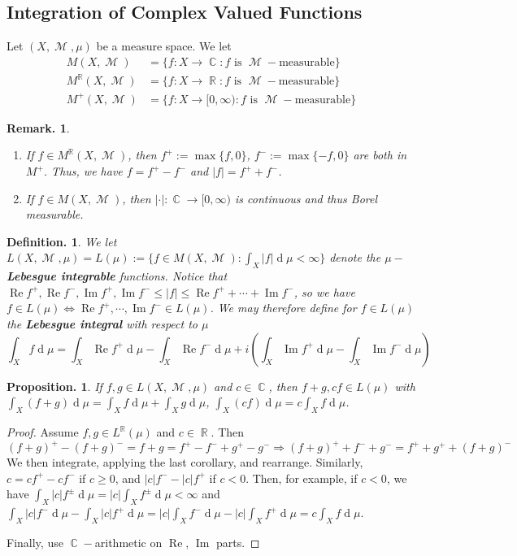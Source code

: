 \documentclass[11pt, a4paper]{memoir}
\DeclareMathOperator{\R}{{\mathbb{R}}}
\DeclareMathOperator{\C}{{\mathbb{C}}}
\theoremstyle{change}
\newtheorem{proposition}[theorem]{Proposition.}
\theoremstyle{plain}
\theoremstyle{nonumberplain}
\newtheorem{definition}{Definition.}
\newtheorem{remark}{Remark.}
\newtheorem{proof}{Proof}
\DeclareMathOperator{\M}{{\mathcal{M}}}
\renewcommand{\Re}{\ensuremath{\operatorname{Re}}}
\renewcommand{\Im}{\ensuremath{\operatorname{Im}}}
\renewcommand{\d}[1]{\ensuremath{\operatorname{d}\!{#1}}}
\numberwithin{equation}{section}
\begin{document}
\subsection{Integration of Complex Valued Functions}
Let $(X,\M,\mu)$ be a measure space.
We let
\begin{align*}
    M(X,\M)&=\{f:X\to\C:f\text{ is $\M-$measurable}\}\\
    M^{\R}(X,\M)&=\{f:X\to\R:f\text{ is $\M-$measurable}\}\\
    M^+(X,\M)&=\{f:X\to[0,\infty):f\text{ is $\M-$measurable}\}
\end{align*}
\begin{remark}
    \begin{enumerate}
        \item If $f\in M^{\R}(X,\M)$, then $f^+:=\max\{f,0\}$, $f^-:=\max\{-f,0\}$ are both in $M^+$.
            Thus, we have $f=f^+-f^-$ and $|f|=f^++f^-$.
        \item If $f\in M(X,\M)$, then $|\cdot|:\C\to[0,\infty)$ is continuous and thus Borel measurable. %
    \end{enumerate}
\end{remark}
\begin{definition}
    We let $L(X,\M,\mu)=L(\mu):=\{f\in M(X,\M):\int_X|f|\d{\mu}<\infty\}$ denote the \textbf{$\mu-$Lebesgue integrable} functions.
    Notice that $\Re f^+,\Re f^-,\Im f^+,\Im f^-\leq |f|\leq\Re f^++\cdots+\Im f^-$, so we have $f\in L(\mu)\Leftrightarrow \Re f^+,\cdots,\Im f^-\in L(\mu)$.
    We may therefore define for $f\in L(\mu)$ the \textbf{Lebesgue integral} with respect to $\mu$
    \begin{equation*}
        \int_X f\d{\mu}=\int_X\Re f^+\d{\mu}-\int_X\Re f^-\d{\mu}+i\left(\int_X\Im f^+\d{\mu}-\int_X\Im f^-\d{\mu}\right)
    \end{equation*}
\end{definition}
\begin{proposition}
    If $f,g\in L(X,\M,\mu)$ and $c\in\C$, then $f+g,cf\in L(\mu)$ with $\int_X(f+g)\d{\mu}=\int_X f\d{\mu}+\int_X g\d{\mu}$, $\int_X(cf)\d{\mu}=c\int_X f\d{\mu}$.
\end{proposition}
\begin{proof}
    Assume $f,g\in L^{\R}(\mu)$ and $c\in\R$.
    Then
    \begin{equation*}
        (f+g)^+-(f+g)^-=f+g=f^+-f^-+g^+-g^-\Rightarrow(f+g)^++f^-+g^-=f^++g^++(f+g)^-
    \end{equation*}
    We then integrate, applying the last corollary, and rearrange.
    Similarly, $c=cf^+-cf^-$ if $c\geq 0$, and $|c|f^--|c|f^+$ if $c<0$.
    Then, for example, if $c<0$, we have $\int_X|c|f^\pm\d{\mu}=|c|\int_Xf^{\pm}\d{\mu}<\infty$ and $\int_X|c|f^-\d{\mu}-\int_X|c|f^+\d{\mu}=|c|\int_X f^-\d{\mu}-|c|\int_X f^+\d{\mu}=c\int_Xf\d{\mu}$.

    Finally, use $\C-$arithmetic on $\Re$, $\Im$ parts.
\end{proof}
\end{document}
